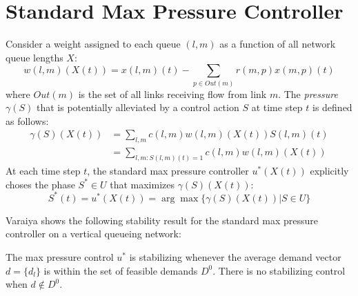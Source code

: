 \section{Standard Max Pressure Controller} \label{sec:immediatefeedback}
%

Consider a weight assigned to each queue $(l,m)$ as a function of all network queue lengths $X$:
\begin{equation} \label{linkweight}
w(l,m)(X(t))= x(l,m)(t) - \sum_{p \in Out(m)} r(m,p)x(m,p)(t)
\end{equation}
where $Out(m)$ is the set of all links receiving flow from link $m$. 
The \emph{pressure} $\gamma(S)$ that is potentially alleviated by a control action $S$ at time step $t$ is defined as follows: 
\begin{align}
\gamma(S)(X(t)) &= \sum_{l,m}c(l,m)w(l,m)(X(t))S(l,m)(t) \\
&= \sum_{l,m: S(l,m)(t) = 1}c(l,m)w(l,m)(X(t))
\end{align}
At each time step $t$, the standard max pressure controller $u^{*}(X(t))$ explicitly choses the phase $S^*\in U$ that maximizes $\gamma(S)(X(t))$:
\begin{equation} \label{original_MP}
S^*(t)  = u^{*}(X(t)) = \arg\max\{\gamma(S)(X(t)) \vert S \in U\} 
\end{equation}

Varaiya \cite{MaxPressureStochastic} shows the following stability result for the standard max pressure controller on a vertical queueing network:
\begin{Thm}\label{StabMP}
The max pressure control $u^{*}$ is stabilizing whenever the average demand vector $d = \lbrace d_{l}\rbrace$ is within the set of feasible demands $D^0$. There is no stabilizing control when $d\not \in D^0$.
\end{Thm}

